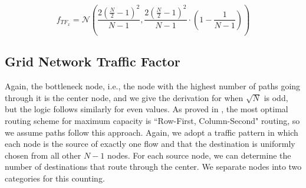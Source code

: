 \begin{equation*}
	f_{TF_x} = \mathcal{N}( \frac{2(\frac{N}{2}-1)^2}{N-1}, \frac{2(\frac{N}{2}-1)^2}{N-1} \cdot ( 1 - \frac{1}{N-1} )  )
\end{equation*}

%
%
%

\subsection{Grid Network Traffic Factor}

Again, the bottleneck node, i.e., the node with the highest number of paths going through it is the center node, and we give the derivation for when $\sqrt{N}$ is odd, but the logic follows similarly for even values.  As proved in \cite{lattice_nets_cap_opt_routing}, the most optimal routing scheme for maximum capacity is ``Row-First, Column-Second" routing, so we assume paths follow this approach.  Again, we adopt a traffic pattern in which each node is the source of exactly one flow and that the destination is uniformly chosen from all other $N-1$ nodes.  
For each source node, we can determine the number of destinations that route through the center.  We separate nodes into two categories for this counting.

